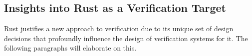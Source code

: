 \documentclass[twoside, english, final]{sdqthesis}
\theoremstyle{definition}
\begin{document}




\subsection{Insights into Rust as a Verification Target}


Rust justifies a new approach to verification due to its unique set of design decisions that profoundly influence the design of verification systems for it. The following paragraphs will elaborate on this.

\end{document}
